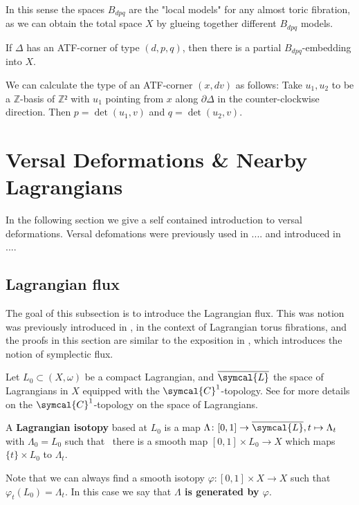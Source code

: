 \documentclass[12pt,a4paper,draft]{scrartcl}
\begin{document}
In this sense the spaces $B_{dpq}$ are the "local models" for any almost toric fibration, as we can obtain the total space $X$ by glueing together different $B_{dpq}$ models.

\begin{lemma}
  \label{thm:atf_bdpq}
  If $Δ$ has an ATF-corner of type $(d,p,q)$, then there is a partial $B_{dpq}$-embedding into $X$.
\end{lemma}

\begin{remark}
  \label{rem:atf_corner_type_calc}
  We can calculate the type of an ATF-corner $(x,dv)$ as follows: Take $u_1,u_2$ to be a $ℤ$-basis of $ℤ²$ with $u_1$ pointing from $x$ along $∂Δ$ in the counter-clockwise direction. Then $p=\det(u_1,v)$ and $q = \det(u_2,v)$.
\end{remark}



\section{Versal Deformations \& Nearby Lagrangians}

In the following section we give a self contained introduction to versal deformations. Versal defomations were previously used in .... and introduced in .... 

\subsection{Lagrangian flux}

The goal of this subsection is to introduce the Lagrangian flux.
This was notion was previously introduced in \cite[Section 2.4]{evans2021atfs}, in the context of Lagrangian torus fibrations, and the proofs in this section are similar to the exposition in \cite[Section 10.2]{McDuffSalamonSympTop}, which introduces the notion of symplectic flux.

Let $L_0 ⊂ (X,ω)$ be a compact Lagrangian, and $\overline{\symcal{L}}$ the space of Lagrangians in $X$ equipped with the $\symcal{C}^1$-topology.
See \cite{ono2008LagrangianFlux} for more details on the $\symcal{C}^1$-topology on the space of Lagrangians. 

\begin{definition}
  A \textbf{Lagrangian isotopy} based at $L_0$ is a map $\Lambda \colon [0,1] \rightarrow \overline{\symcal{L}}, t \mapsto \Lambda_t$ with $\Lambda_0 = L_0$ such that \ there is a smooth map $[0,1] \times L_0 \rightarrow X$ which maps $\{t\} \times L_0$ to $\Lambda_t$.

  Note that we can always find a smooth isotopy $φ \colon [0,1] × X → X$ such that\ $φ_t(L_0) = Λ_t$.
  In this case we say that \textbf{$Λ$ is generated by $φ$}.
\end{definition}
\end{document}
